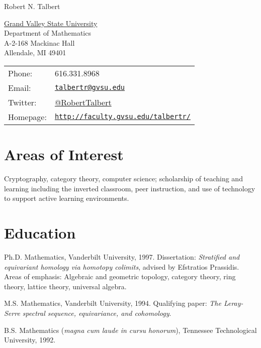 \documentclass[letterpaper]{article}
\def\name{Robert N. Talbert}
\renewenvironment{itemize}{
  \begin{list}{}{
    \setlength{\leftmargin}{1.5em}
	\setlength{\itemsep}{0in}
  }
}{
  \end{list}
}
\begin{document}
{\Large \name}


\vspace{0.25in}

\begin{minipage}{0.45\linewidth}
  \href{http://www.gvsu.edu/}{Grand Valley State University} \\
  Department of Mathematics \\
  A-2-168 Mackinac Hall \\
  Allendale, MI 49401
\end{minipage}
\begin{minipage}{0.45\linewidth}
  \begin{tabular}{ll}
    Phone: & 616.331.8968 \\
    Email: & \href{mailto:talbertr@gvsu.edu}{\tt talbertr@gvsu.edu} \\
	Twitter: & \href{http://www.twitter.com/RobertTalbert}{@RobertTalbert} \\
    Homepage: & \href{http://faculty.gvsu.edu/talbertr/}{\tt http://faculty.gvsu.edu/talbertr/} \\
  \end{tabular}
\end{minipage}


\section*{Areas of Interest}

Cryptography, category theory, computer science; scholarship of teaching and learning including the inverted classroom, peer instruction, and use of technology to support active learning environments.

\section*{Education}

\begin{itemize}
  \item Ph.D. Mathematics, Vanderbilt University, 1997. Dissertation: \emph{Stratified and equivariant homology via homotopy colimits}, advised by Efstratios Prassidis. Areas of emphasis: Algebraic and geometric topology, category theory, ring theory, lattice theory, universal algebra.


  \item M.S. Mathematics, Vanderbilt University, 1994. Qualifying paper: \emph{The Leray-Serre spectral sequence, equivariance, and cohomology}. 

  \item B.S. Mathematics (\emph{magna cum laude in cursu honorum}), Tennessee Technological University, 1992. 

\end{itemize}
\end{document}
